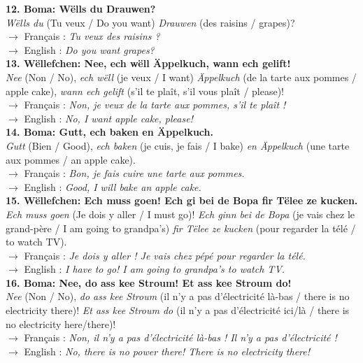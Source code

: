 \noindent\textbf{12. Boma: Wëlls du Drauwen?}\\
\textit{Wëlls du} (Tu veux / Do you want) \textit{Drauwen} (des raisins / grapes)?\\
$\rightarrow$ Français : \textit{Tu veux des raisins ?}\\
$\rightarrow$ English : \textit{Do you want grapes?}\\[0.5em]

\noindent\textbf{13. Wëllefchen: Nee, ech wëll Äppelkuch, wann ech gelift!}\\
\textit{Nee} (Non / No), \textit{ech wëll} (je veux / I want) \textit{Äppelkuch} (de la tarte aux pommes / apple cake), \textit{wann ech gelift} (s'il te plaît, s'il vous plaît / please)!\\
$\rightarrow$ Français : \textit{Non, je veux de la tarte aux pommes, s'il te plaît !}\\
$\rightarrow$ English : \textit{No, I want apple cake, please!}\\[0.5em]

\noindent\textbf{14. Boma: Gutt, ech baken en Äppelkuch.}\\
\textit{Gutt} (Bien / Good), \textit{ech baken} (je cuis, je fais / I bake) \textit{en Äppelkuch} (une tarte aux pommes / an apple cake).\\
$\rightarrow$ Français : \textit{Bon, je fais cuire une tarte aux pommes.}\\
$\rightarrow$ English : \textit{Good, I will bake an apple cake.}\\[0.5em]

\noindent\textbf{15. Wëllefchen: Ech muss goen! Ech gi bei de Bopa fir Tëlee ze kucken.}\\
\textit{Ech muss goen} (Je dois y aller / I must go)! \textit{Ech ginn bei de Bopa} (je vais chez le grand-père / I am going to grandpa's) \textit{fir Tëlee ze kucken} (pour regarder la télé / to watch TV).\\
$\rightarrow$ Français : \textit{Je dois y aller ! Je vais chez pépé pour regarder la télé.}\\
$\rightarrow$ English : \textit{I have to go! I am going to grandpa's to watch TV.}\\[0.5em]

\noindent\textbf{16. Boma: Nee, do ass kee Stroum! Et ass kee Stroum do!}\\
\textit{Nee} (Non / No), \textit{do ass kee Stroum} (il n'y a pas d'électricité là-bas / there is no electricity there)! \textit{Et ass kee Stroum do} (il n'y a pas d'électricité ici/là / there is no electricity here/there)!\\
$\rightarrow$ Français : \textit{Non, il n'y a pas d'électricité là-bas ! Il n'y a pas d'électricité !}\\
$\rightarrow$ English : \textit{No, there is no power there! There is no electricity there!}\\[0.5em]

